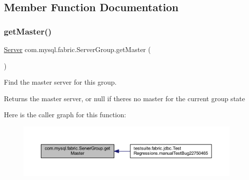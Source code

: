 \subsection{Member Function Documentation}
\mbox{\label{classcom_1_1mysql_1_1fabric_1_1_server_group_ac2ba8dc80be8118578f35d07727297d8}} 
\subsubsection{\texorpdfstring{get\+Master()}{getMaster()}}
{\footnotesize\ttfamily \mbox{\hyperlink{classcom_1_1mysql_1_1fabric_1_1_server}{Server}} com.\+mysql.\+fabric.\+Server\+Group.\+get\+Master (\begin{DoxyParamCaption}{ }\end{DoxyParamCaption})}

Find the master server for this group.

\begin{DoxyReturn}{Returns}
the master server, or null if there\textquotesingle{}s no master for the current group state 
\end{DoxyReturn}
Here is the caller graph for this function\+:\nopagebreak
\begin{figure}[H]
\begin{center}
\leavevmode
\includegraphics[width=350pt]{classcom_1_1mysql_1_1fabric_1_1_server_group_ac2ba8dc80be8118578f35d07727297d8_icgraph}
\end{center}
\end{figure}
\mbox{\label{classcom_1_1mysql_1_1fabric_1_1_server_group_aa0c3aa4598de2ca177d4df8bf95dae23}} 
